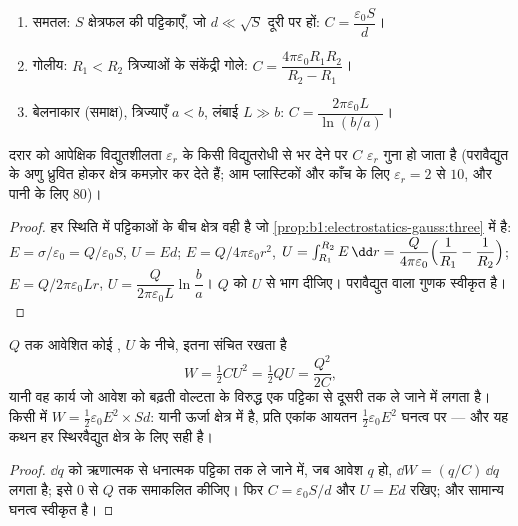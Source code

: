 \begin{proposition}[तीन संधारित्र]\label{prop:b1:potential-capacitors:three}
\begin{enumerate}
  \item समतल: $S$ क्षेत्रफल की पट्टिकाएँ, जो $d \ll \sqrt S$ दूरी पर हों:
        $C = \dfrac{\varepsilon_0S}{d}$।
  \item गोलीय: $R_1 < R_2$ त्रिज्याओं के संकेंद्री गोले:
        $C = \dfrac{4\pi\varepsilon_0R_1R_2}{R_2 - R_1}$।
  \item बेलनाकार (समाक्ष), त्रिज्याएँ $a < b$, लंबाई $L \gg b$:
        $C = \dfrac{2\pi\varepsilon_0L}{\ln(b/a)}$।
\end{enumerate}
दरार को आपेक्षिक विद्युतशीलता
$\varepsilon_r$ के किसी विद्युतरोधी से भर देने पर $C$ $\varepsilon_r$ गुना हो जाता है
(परावैद्युत के अणु ध्रुवित होकर क्षेत्र कमज़ोर कर देते हैं; आम प्लास्टिकों
और काँच के लिए $\varepsilon_r = 2$ से $10$, और पानी के लिए $80$)।
\end{proposition}

\begin{proof}
हर स्थिति में पट्टिकाओं के बीच क्षेत्र वही है जो
\cref{prop:b1:electrostatics-gauss:three} में है: $E = \sigma/\varepsilon_0 = Q/\varepsilon_0S$,
$U = Ed$; $E = Q/4\pi\varepsilon_0r^2$, $U = \int_{R_1}^{R_2}E\,\dd r = \dfrac{Q}{4\pi\varepsilon_0}
\Bigl(\dfrac1{R_1} - \dfrac1{R_2}\Bigr)$; $E = Q/2\pi\varepsilon_0Lr$, $U =
\dfrac{Q}{2\pi\varepsilon_0L}\ln\dfrac ba$। $Q$ को $U$ से भाग दीजिए। परावैद्युत
वाला गुणक स्वीकृत है।
\end{proof}

\begin{theorem}[किसी संधारित्र की ऊर्जा]\label{thm:b1:potential-capacitors:energy}
$Q$ तक आवेशित कोई , $U$ के नीचे, इतना संचित रखता है
\[
W = \tfrac12 CU^2 = \tfrac12 QU = \frac{Q^2}{2C} ,
\]
यानी वह कार्य जो आवेश को बढ़ती वोल्टता के विरुद्ध एक पट्टिका से दूसरी तक ले
जाने में लगता है। किसी  में $W = \tfrac12\varepsilon_0E^2
\times Sd$: यानी ऊर्जा क्षेत्र में है, प्रति एकांक आयतन
$\tfrac12\varepsilon_0E^2$ घनत्व पर --- और यह कथन हर स्थिरवैद्युत क्षेत्र के लिए
सही है।
\end{theorem}

\begin{proof}
$\dd q$ को ऋणात्मक से धनात्मक पट्टिका तक ले जाने में, जब आवेश $q$ हो,
$\dd W = (q/C)\,\dd q$ लगता है; इसे $0$ से $Q$ तक समाकलित कीजिए। फिर
$C = \varepsilon_0S/d$ और $U = Ed$ रखिए; और सामान्य घनत्व स्वीकृत है।
\end{proof}

